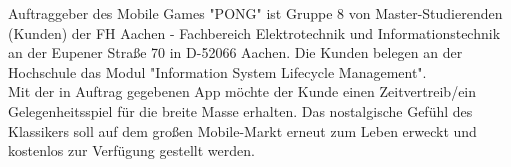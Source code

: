 Auftraggeber des Mobile Games "PONG" ist Gruppe 8 von Master-Studierenden (Kunden)
der FH Aachen - Fachbereich Elektrotechnik und Informationstechnik an der Eupener Straße 70 in D-52066 Aachen. Die Kunden belegen an der Hochschule das Modul "Information System Lifecycle Management". \\
Mit der in Auftrag gegebenen App möchte der Kunde einen Zeitvertreib/ein Gelegenheitsspiel für die breite Masse erhalten. Das nostalgische Gefühl des Klassikers soll auf dem großen Mobile-Markt erneut zum Leben erweckt und kostenlos zur Verfügung gestellt werden.